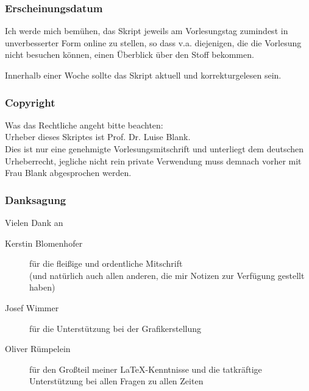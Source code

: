 \subsubsection{Erscheinungsdatum}
Ich werde mich bemühen, das Skript jeweils am Vorlesungstag zumindest in 
unverbesserter Form online zu stellen, so dass v.a. diejenigen, die die Vorlesung
nicht besuchen können, einen Überblick über den Stoff bekommen.

Innerhalb einer Woche sollte das Skript aktuell und korrekturgelesen sein.


\subsubsection{Copyright}
Was das Rechtliche angeht bitte beachten: \\
Urheber dieses Skriptes ist Prof. Dr. Luise Blank. \\
Dies ist nur eine genehmigte Vorlesungsmitschrift und unterliegt dem deutschen
Urheberrecht, jegliche nicht rein private Verwendung muss demnach vorher mit
Frau Blank abgesprochen werden.\\


\subsubsection*{Danksagung}
Vielen Dank an
\begin{description}
	\item[Kerstin Blomenhofer] für die fleißige und ordentliche Mitschrift\\
		(und natürlich auch allen anderen, die mir Notizen zur Verfügung gestellt haben)
	\item[Josef Wimmer] für die Unterstützung bei der Grafikerstellung
	\item[Oliver Rümpelein] für den Großteil meiner \LaTeX-Kenntnisse und
		die tatkräftige Unterstützung bei allen Fragen zu allen Zeiten
\end{description}